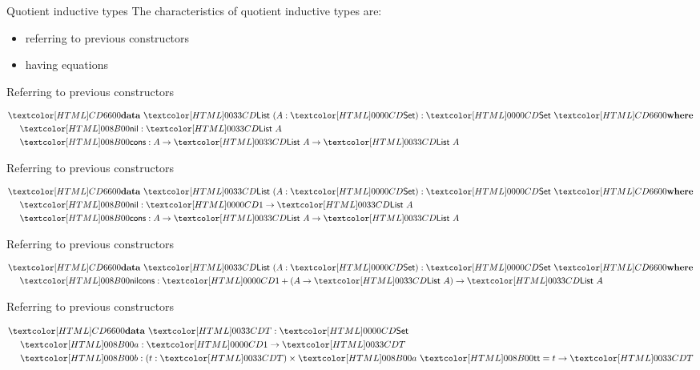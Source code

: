 \begin{frame}{Quotient inductive types}
  The characteristics of quotient inductive types are:

  \begin{itemize}
  \item referring to previous constructors
  \item having equations
  \end{itemize}
\end{frame}

\begin{frame}{Referring to previous constructors}
  
  \begin{align*}
    &\data\ \List\ (A : \Set) : \Set\ \where \\
    &\ \ \ \ \listnil : \List\ A \\
    &\ \ \ \ \listcons : A \to \List\ A \to \List\ A
  \end{align*}

\end{frame}

\begin{frame}{Referring to previous constructors}
  
  \begin{align*}
    &\data\ \List\ (A : \Set) : \Set\ \where \\
    &\ \ \ \ \listnil : \unitty \to \List\ A \\
    &\ \ \ \ \listcons : A \to \List\ A \to \List\ A
  \end{align*}

\end{frame}

\begin{frame}{Referring to previous constructors}
  
  \begin{align*}
    &\data\ \List\ (A : \Set) : \Set\ \where \\
    &\ \ \ \ \listnilcons : \unitty + (A \to \List\ A) \to \List\ A \\
  \end{align*}

\end{frame}

\begin{frame}{Referring to previous constructors}
  
  \begin{align*}
    &\data\ \Tty : \Set \\
    &\ \ \ \ \Ta :\unitty \to \Tty \\
    &\ \ \ \ \Tb : (t : \Tty) \times \Ta\ \unitval = t \to \Tty
  \end{align*}

\end{frame}

